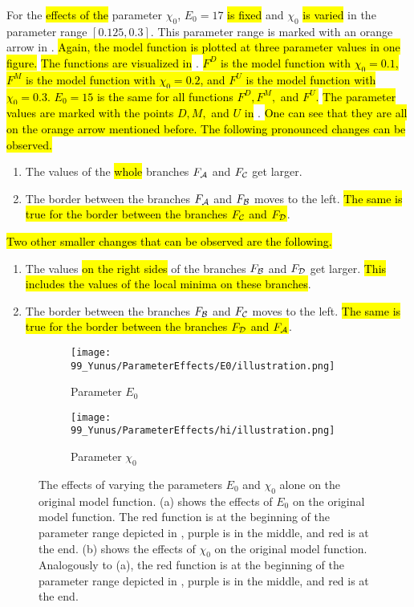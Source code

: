 For the \hl{effects of the} parameter $\chi_0$, $E_0 = 17$ \hl{is fixed} and $\chi_0$ \hl{is varied} in the parameter range $[0.125, 0.3]$.
This parameter range is marked with an orange arrow in .
\hl{
	Again, the model function is plotted at three parameter values in one figure.
}
\hl{The functions are visualized in} .
\hl{
	$F^D$ is the model function with $\chi_0 = 0.1$, $F^M$ is the model function with $\chi_0 = 0.2$, and $F^U$ is the model function with $\chi_0 = 0.3$.
	$E_0 = 15$ is the same for all functions $F^D, F^M,$ and $F^U$.
}
\hl{The parameter values are marked with the points $D, M,$ and $U$ in} .
\hl{
	One can see that they are all on the orange arrow mentioned before.
	The following pronounced changes can be observed.
}
\begin{enumerate}
	\item The values of the \hl{whole} branches $F_{\mathcal{A}}$ and $F_{\mathcal{C}}$ get larger.
	\item The border between the branches $F_{\mathcal{A}}$ and $F_{\mathcal{B}}$ moves to the left.
	      \hl{The same is true for the border between the branches $F_{\mathcal{C}}$ and $F_{\mathcal{D}}$}.
\end{enumerate}
\hl{
	Two other smaller changes that can be observed are the following.
}
\begin{enumerate}
	\item The values \hl{on the right sides} of the branches $F_{\mathcal{B}}$ and $F_{\mathcal{D}}$ get larger.
	      \hl{This includes the values of the local minima on these branches}.
	\item The border between the branches $F_{\mathcal{B}}$ and $F_{\mathcal{C}}$ moves to the left.
	      \hl{The same is true for the border between the branches $F_{\mathcal{D}}$ and $F_{\mathcal{A}}$}.
\end{enumerate}

\begin{figure}
	\centering
	\begin{subfigure}{0.4\textwidth}
		\texttt{[image: 99\_Yunus/ParameterEffects/E0/illustration.png]}
		\caption{Parameter $E_0$}
		\label{fig:setup.char.evolution.e0}
	\end{subfigure}
	\begin{subfigure}{0.4\textwidth}
		\texttt{[image: 99\_Yunus/ParameterEffects/hi/illustration.png]}
		\caption{Parameter $\chi_0$}
		\label{fig:setup.char.evolution.hi}
	\end{subfigure}
	\caption[The effects of single parameters on the original model function]{
		The effects of varying the parameters $E_0$ and $\chi_0$ alone on the original model function.
		(a) shows the effects of $E_0$ on the original model function.
		The red function is at the beginning of the parameter range depicted in , purple is in the middle, and red is at the end.
		(b) shows the effects of $\chi_0$ on the original model function.
		Analogously to (a), the red function is at the beginning of the parameter range depicted in , purple is in the middle, and red is at the end.
	}
	\label{fig:setup.char.evolution.single}
\end{figure}

